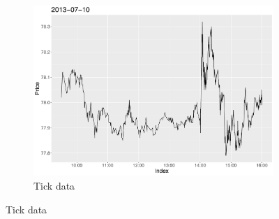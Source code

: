 \begin{figure}[htbp]
	\centering
	
	\begin{subfigure}{\textwidth}
		\centering
		\includegraphics[scale=.5]{img/dataBars/regularZoom}
		\caption{Tick data}
	\end{subfigure}%
	
	\vspace{.4cm}
	

\end{figure}
